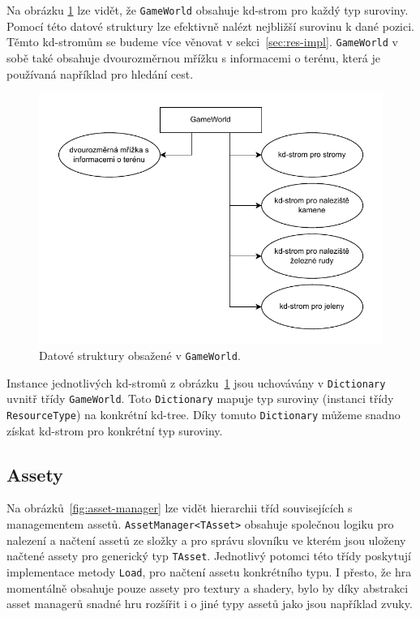 Na obrázku \ref{fig:game-world} lze vidět, že \texttt{GameWorld} obsahuje kd-strom pro každý typ suroviny. Pomocí této datové struktury lze efektivně nalézt nejbližší surovinu k dané pozici. Těmto kd-stromům se budeme více věnovat v sekci~\ref{sec:res-impl}. \texttt{GameWorld} v sobě také obsahuje dvourozměrnou mřížku s informacemi o terénu, která je používaná například pro hledání cest.

\begin{figure}[!htb]
  \centering
  \includegraphics[width=0.8\linewidth]{img/game-world.pdf}
  \caption{Datové struktury obsažené v \texttt{GameWorld}.}
  \label{fig:game-world}
\end{figure}

Instance jednotlivých kd-stromů z obrázku~\ref{fig:game-world} jsou uchovávány v \texttt{Dictionary} uvnitř třídy \texttt{GameWorld}. Toto \texttt{Dictionary} mapuje typ suroviny (instanci třídy \texttt{ResourceType}) na konkrétní kd-tree. Díky tomuto \texttt{Dictionary} můžeme snadno získat kd-strom pro konkrétní typ suroviny.

\subsection{Assety}
Na obrázků~\ref{fig:asset-manager} lze vidět hierarchii tříd souvisejících s managementem assetů. \texttt{AssetManager<TAsset>} obsahuje společnou logiku pro nalezení a načtení assetů ze složky a pro správu slovníku ve kterém jsou uloženy načtené assety pro generický typ \texttt{TAsset}. Jednotlivý potomci této třídy poskytují implementace metody \texttt{Load}, pro načtení assetu konkrétního typu. I přesto, že hra momentálně obsahuje pouze assety pro textury a shadery, bylo by díky abstrakci asset managerů snadné hru rozšířit i o jiné typy assetů jako jsou například zvuky.

